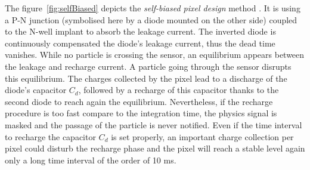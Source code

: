     The figure~\ref{fig:selfBiased} depicts the \textit{self-biased pixel design} method \cite{Deveaux2009}.
    It is using a P-N junction (symbolised here by a diode mounted on the other side) coupled to the N-well implant to absorb the leakage current.
    The inverted diode is continuously compensated the diode's leakage current, thus the dead time vanishes.
    While no particle is crossing the sensor, an equilibrium appears between the leakage and recharge current.
    A particle going through the sensor disrupts this equilibrium.
    The charges collected by the pixel lead to a discharge of the diode's capacitor $C_d$, followed by a recharge of this capacitor thanks to the second diode to reach again the equilibrium.
    Nevertheless, if the recharge procedure is too fast compare to the integration time, the physics signal is masked and the passage of the particle is never notified.
    Even if the time interval to recharge the capacitor $C_d$ is set properly, an important charge collection per pixel could disturb the recharge phase and the pixel will reach a stable level again only a long time interval of the order of 10 ms.

